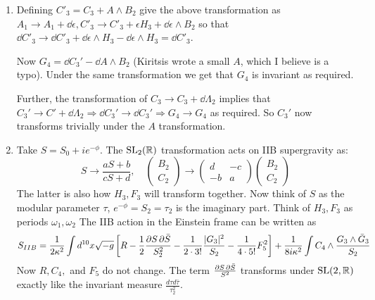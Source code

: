 \documentclass[11pt, class=article, crop=false]{standalone}
\begin{document}
\begin{enumerate}
	It remains to look at the variation of $B_2 \wedge \dd C_3 \wedge \dd C_3$. This is
	\[
	B_2 \wedge \dd \epsilon \wedge H_3 \wedge \dd C_3 + B_2 \wedge \dd C_3 \wedge \dd \epsilon \wedge H_3.	
	\]
	 These two terms are in fact equal (we are commuting even-degree forms), giving $2 B_2 \wedge \dd \epsilon \wedge H_3 \wedge \dd C_3$. Integrating by parts to move the $\dd$ off of $\epsilon$, the variation vanishes since $H_3 \wedge H_3 = 0$ for the odd form $H_3$.
	
	\item Defining $C'_3 = C_3 + A \wedge B_2$ give the above transformation as $A_1 \to A_1 + \dd \epsilon, C'_3 \to C'_3 + \epsilon H_3 + \dd \epsilon \wedge B_2$ so that $\dd C'_3 \to \dd C'_3 + \dd \epsilon \wedge H_3 - \dd \epsilon \wedge H_3 = \dd C'_3$. 
	
	Now $G_4 = \dd C_3' - \dd A \wedge B_2$ (Kiritsis wrote a small $A$, which I believe is a typo). Under the same transformation we get that $G_4$ is invariant as required. 
	
	Further, the transformation of $C_3 \to C_3 + \dd \Lambda_2$ implies that $C_3' \to C' + \dd \Lambda_2 \Rightarrow \dd C_3' \to \dd C_3' \Rightarrow G_4 \to G_4$ as required. So $C_3'$ now transforms trivially under the $A$ transformation.
	
	\item Take $S = S_0 + i e^{-\phi}$. The $\mathrm{SL}_2(\mathbb{R})$ transformation acts on IIB supergravity as:
	\[
		S \to \frac{a S + b}{c S + d}, \quad \begin{pmatrix}
			B_2\\
			C_2
		\end{pmatrix}
		\to \begin{pmatrix}
			d & -c\\
			-b & a
		\end{pmatrix} \begin{pmatrix}
			B_2 \\ 
			C_2
		\end{pmatrix}
	\]
	The latter is also how $H_3, F_3$ will transform together. Now think of $S$ as the modular parameter $\tau$, $e^{-\phi}= S_2 = \tau_2$ is the imaginary part. Think of $H_3, F_3$ as periods $\omega_1, \omega_2$ The IIB action in the Einstein frame can be written as
	\[
		S_{IIB} = \frac{1}{2\kappa^2} \int d^{10} x \sqrt{-g} \left[R - \frac12 \frac{\partial S\, \partial \bar S}{S_2^2} - \frac1{2\cdot 3!} \frac{|G_3|^2}{S_2} -\frac{1}{4 \cdot 5!} F_5^2 \right] + \frac{1}{8 i \kappa^2} \int C_4 \wedge \frac{G_3 \wedge \bar G_3}{S_2}
	\]
	Now $R, C_4,$ and $F_5$ do not change. The term $\frac{\partial S\, \partial \bar S}{S^2}$ transforms under $\mathrm{SL}(2, \mathbb{R})$ exactly like the invariant measure $\frac{d\tau d \bar \tau}{\tau^2_2}$. 
	

\end{enumerate}
\end{document}
